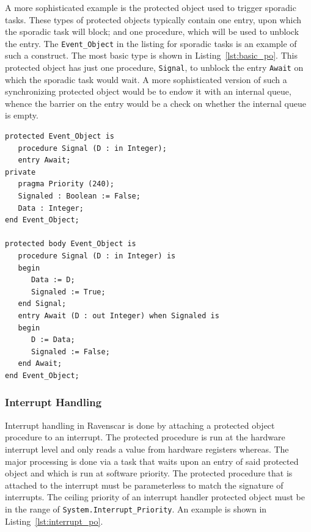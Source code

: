 A more sophisticated example is the protected object used to trigger
sporadic tasks. These types of protected objects typically contain one
entry, upon which the sporadic task will block; and one procedure,
which will be used to unblock the entry. The \texttt{Event\_Object} in
the listing for sporadic tasks is an example of such a construct. The
most basic type is shown in Listing~\ref{lst:basic_po}. This protected
object has just one procedure, \texttt{Signal}, to unblock the entry
\texttt{Await} on which the sporadic task would wait. A more
sophisticated version of such a synchronizing protected object would
be to endow it with an internal queue, whence the barrier on the entry
would be a check on whether the internal queue is empty.

\begin{minipage}{\listingwidth}
\lstset{language=ada,
  numbers=left,
  numberstyle=\tiny
}
\begin{lstlisting}[label=lst:basic_po, caption=A protected object used
    to synchronize two tasks with no data exchanged]
protected Event_Object is
   procedure Signal (D : in Integer);
   entry Await;
private
   pragma Priority (240);
   Signaled : Boolean := False;
   Data : Integer;
end Event_Object;

protected body Event_Object is
   procedure Signal (D : in Integer) is
   begin
      Data := D;
      Signaled := True;
   end Signal;
   entry Await (D : out Integer) when Signaled is
   begin
      D := Data;
      Signaled := False;
   end Await;
end Event_Object;
\end{lstlisting}
\end{minipage}

\subsubsection{Interrupt Handling}
Interrupt handling in Ravenscar is done by attaching a protected
object procedure to an interrupt. The protected procedure is run at
the hardware interrupt level and only reads a value from hardware
registers whereas. The major processing is done via a task that waits
upon an entry of said protected object and which is run at software
priority. The protected procedure that is attached to the interrupt
must be parameterless to match the signature of interrupts. The
ceiling priority of an interrupt handler protected object must be in
the range of \texttt{System.Interrupt\_Priority}. An example is shown
in Listing~\ref{lst:interrupt_po}.

